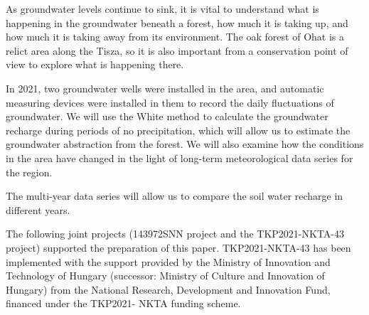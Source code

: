 



\newpage{}
{}
\begin{flushleft}





\end{flushleft}

\noindent

As groundwater levels continue to sink, it is vital to understand what is happening in the groundwater beneath a forest, how much it is taking up, and how much it is taking away from its environment. The oak forest of Ohat is a relict area along the Tisza, so it is also important from a conservation point of view to explore what is happening there.

In 2021, two groundwater wells were installed in the area, and automatic measuring devices were installed in them to record the daily fluctuations of groundwater. We will use the White method to calculate the groundwater recharge during periods of no precipitation, which will allow us to estimate the groundwater abstraction from the forest. We will also examine how the conditions in the area have changed in the light of long-term meteorological data series for the region.

The multi-year data series will allow us to compare the soil water recharge in different years.

The following joint projects (143972SNN project and the TKP2021-NKTA-43 project) supported the preparation of this paper. TKP2021-NKTA-43 has been implemented with the support provided by the Ministry of Innovation and Technology of Hungary (successor: Ministry of Culture and Innovation of Hungary) from the National Research, Development and Innovation Fund, financed under the TKP2021- NKTA funding scheme.

